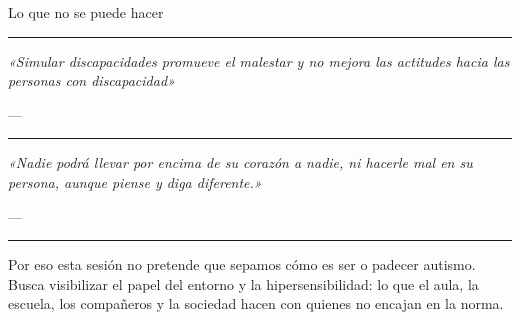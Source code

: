 \begin{frame}{Lo que no se puede hacer}
  {\color{ColorAcento}\rule{\textwidth}{0.8pt}}

  \vspace{0.15cm}
  {\normalsize\itshape\color{ColorPrincipal}
    «Simular discapacidades promueve el malestar y no mejora las actitudes hacia
    las personas con discapacidad»\par}
  \vspace{0.05cm}
  {\raggedleft\footnotesize\color{gray!70}
    --- \citet[p.~324]{nario2017}\par}

  \vspace{0.2cm}
  {\color{ColorAcento}\rule{0.6\textwidth}{0.5pt}}

  \vspace{0.15cm}
  {\normalsize\itshape\color{ColorPrincipal}
    «Nadie podrá llevar por encima de su corazón a nadie, ni hacerle mal en su
    persona, aunque piense y diga diferente.»\par}
  \vspace{0.05cm}
  {\raggedleft\footnotesize\color{gray!70}
    --- \citet{garzon1997discurso}\par}

  \vspace{0.15cm}
  {\color{ColorAcento}\rule{\textwidth}{0.8pt}}

  \vspace{0.15cm}
  {\small Por eso esta sesión no pretende que sepamos cómo es ser o padecer
  autismo. Busca visibilizar el papel del entorno y la hipersensibilidad: lo que
  el aula, la escuela, los compañeros y la sociedad hacen con quienes no encajan
  en la norma.\par}
\end{frame}

